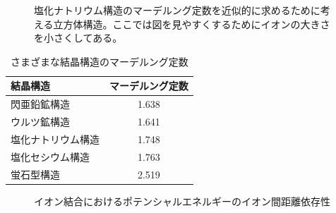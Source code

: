 \documentclass[a4paper,11pt]{ltjsarticle}
\begin{document}
\begin{figure}[h]
  \centering
  \caption{塩化ナトリウム構造のマーデルング定数を近似的に求めるために考える立方体構造。ここでは図を見やすくするためにイオンの大きさを小さくしてある。}
\end{figure}

\begin{table}[h]
  \centering
  \caption{さまざまな結晶構造のマーデルング定数}
  \begin{tabular}{lc}
    \hline
    結晶構造 & マーデルング定数 \\
    \hline
    閃亜鉛鉱構造 & 1.638 \\
    ウルツ鉱構造 & 1.641 \\
    塩化ナトリウム構造 & 1.748 \\
    塩化セシウム構造 & 1.763 \\
    蛍石型構造 & 2.519 \\
    \hline
  \end{tabular}
\end{table}

\begin{figure}[h]
  \centering
  \caption{イオン結合におけるポテンシャルエネルギーのイオン間距離依存性}
\end{figure}
\end{document}
